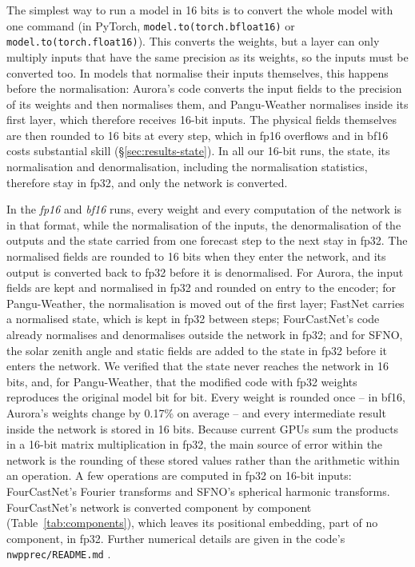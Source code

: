 The simplest way to run a model in 16 bits is to convert the whole
model with one command (in PyTorch, \texttt{model.to(torch.bfloat16)} or
\texttt{model.to(torch.float16)}). This converts the weights, but a layer
can only multiply inputs that have the same precision as its weights, so
the inputs must be converted too. In models that normalise their inputs
themselves, this happens before the normalisation: Aurora's code
converts the input fields to the precision of its weights and then
normalises them, and Pangu-Weather normalises inside its first layer,
which therefore receives 16-bit inputs. The physical fields themselves
are then rounded to 16 bits at every step, which in fp16 overflows and in
bf16 costs substantial skill (\S\ref{sec:results-state}). In all our
16-bit runs, the state, its normalisation and denormalisation, including
the normalisation statistics, therefore stay in fp32, and only the
network is converted.

In the \emph{fp16} and \emph{bf16} runs, every weight and every
computation of the network is in that format, while the normalisation of
the inputs, the denormalisation of the outputs and the state carried from
one forecast step to the next stay in fp32. The normalised fields are rounded to 16
bits when they enter the network, and its output is converted back to
fp32 before it is denormalised. For Aurora, the input fields are kept and
normalised in fp32 and rounded on entry to the encoder; for
Pangu-Weather, the normalisation is moved out of the first layer; FastNet
carries a normalised state, which is kept in fp32 between steps;
FourCastNet's code already normalises and denormalises outside the
network in fp32; and for SFNO, the solar zenith angle and static fields
are added to the state in fp32 before it enters the network. We verified that the state never reaches the
network in 16 bits, and, for Pangu-Weather, that the modified code with
fp32 weights reproduces the original model bit for bit. Every weight is
rounded once -- in bf16, Aurora's weights change by 0.17\% on average --
and every intermediate result inside the network is stored in 16 bits.
Because current GPUs sum the products in a 16-bit matrix multiplication
in fp32, the main source of error within the network is the rounding of
these stored values rather than the arithmetic within an operation. A
few operations are computed in fp32 on 16-bit inputs: FourCastNet's
Fourier transforms and SFNO's spherical harmonic transforms. FourCastNet's network is converted component by
component (Table~\ref{tab:components}), which leaves its positional
embedding, part of no component, in fp32. Further numerical details are
given in the code's \texttt{nwpprec/README.md} \citep{siegert2026code}.

